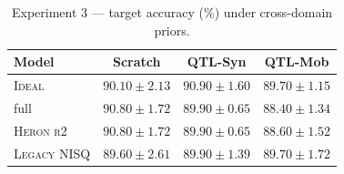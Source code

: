 \begin{table}[ht]
\centering
\caption{Experiment 3 — target accuracy (\%) under cross-domain priors.}
\label{tab:crossdomain}
\begin{tabular}{lccc}
\toprule
\textbf{Model} & Scratch & QTL-Syn & QTL-Mob \\
\midrule
\textsc{Ideal} & $90.10 \pm 2.13$ & $90.90 \pm 1.60$ & $89.70 \pm 1.15$ \\
full & $90.80 \pm 1.72$ & $89.90 \pm 0.65$ & $88.40 \pm 1.34$ \\
\textsc{Heron r2} & $90.80 \pm 1.72$ & $89.90 \pm 0.65$ & $88.60 \pm 1.52$ \\
\textsc{Legacy NISQ} & $89.60 \pm 2.61$ & $89.90 \pm 1.39$ & $89.70 \pm 1.72$ \\
\bottomrule
\end{tabular}
\end{table}
